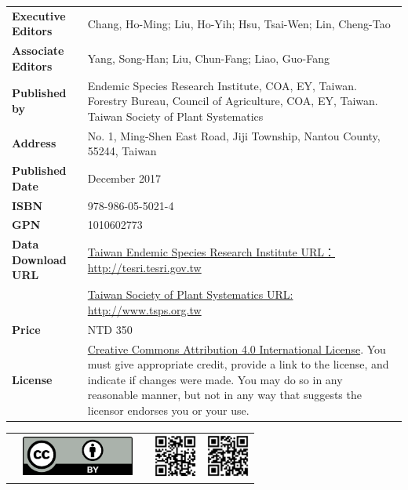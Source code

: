 \begin{table}[H]
{\begin{tabular}{>{\raggedleft\arraybackslash}p{2.5cm}p{9cm}}
      \textbf{Executive Editors}  & Chang, Ho-Ming; Liu, Ho-Yih; Hsu, Tsai-Wen; Lin, Cheng-Tao \\
      \textbf{Associate Editors}  & Yang, Song-Han; Liu, Chun-Fang; Liao, Guo-Fang \\
      \textbf{Published by}       & Endemic Species Research Institute, COA, EY, Taiwan.
                                    Forestry Bureau, Council of Agriculture, COA, EY, Taiwan.
                                    Taiwan Society of Plant Systematics \\
      \textbf{Address}            & No. 1, Ming-Shen East Road, Jiji Township, Nantou County, 55244, Taiwan \\
      \textbf{Published Date}     & December 2017 \\
      \textbf{ISBN}               & 978-986-05-5021-4 \\
      \textbf{GPN}                & 1010602773 \\
      \textbf{Data Download URL}  & \href{http://tesri.tesri.gov.tw}{Taiwan Endemic Species Research Institute URL：http://tesri.tesri.gov.tw} \\
                                  & \href{http://www.tsps.org.tw}{Taiwan Society of Plant Systematics URL: http://www.tsps.org.tw} \\
      \textbf{Price}              & NTD 350 \\
      \textbf{License}            & \href{https://creativecommons.org/licenses/by/4.0}{Creative Commons Attribution 4.0 International License}.
                                     You must give appropriate credit, provide a link to the license,
                                     and indicate if changes were made. You may do so in any reasonable manner,
                                     but not in any way that suggests the licensor endorses you or your use. \\
  \end{tabular}
  }
\end{table}

\begin{tabular}{p{2.5cm}p{3cm}p{1.0cm}p{1.6cm}p{1.6cm}}
    & \includegraphics[width=10em]{images/ccby40.png} & &
    \includegraphics[width=1.4cm]{images/tesri.png} &
    \includegraphics[width=1.4cm]{images/tsps.png} \\
\end{tabular}
